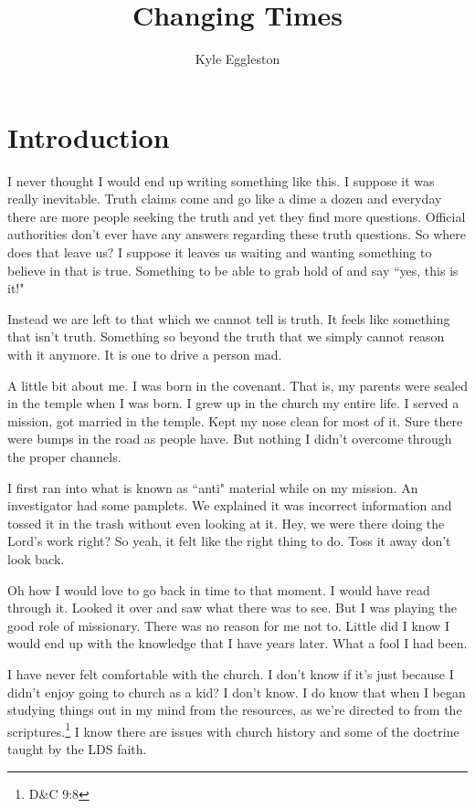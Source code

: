 \documentclass{article}
\title{Changing Times}
\author{Kyle Eggleston}
\begin{document}
\maketitle
\newpage

\tableofcontents
\thispagestyle{empty}
\newpage

\section{Introduction}

I never thought I would end up writing something like this. I suppose it was
really inevitable. Truth claims come and go like a dime a dozen and everyday
there are more people seeking the truth and yet they find more questions.
Official authorities don't ever have any answers regarding these truth
questions. So where does that leave us? I suppose it leaves us waiting and
wanting something to believe in that is true. Something to be able to grab hold
of and say ``yes, this is it!"

Instead we are left to that which we cannot tell is truth. It feels like
something that isn't truth. Something so beyond the truth that we simply cannot
reason with it anymore. It is one to drive a person mad.

A little bit about me. I was born in the covenant. That is, my parents were
sealed in the temple when I was born. I grew up in the church  my entire life. I
served a mission, got married in the temple. Kept my nose clean for most of it.
Sure there were bumps in the road as people have. But nothing I didn't overcome
through the proper channels.

I first ran into what is known as ``anti" material while on my mission. An
investigator had some pamplets. We explained it was incorrect information and
tossed it in the trash without even looking at it. Hey, we were there doing the
Lord's work right? So yeah, it felt like the right thing to do. Toss it away
don't look back.

Oh how I would love to go back in time to that moment. I would have read through
it. Looked it over and saw what there was to see. But I was playing the good
role of missionary. There was no reason for me not to. Little did I know I would
end up with the knowledge that I have years later. What a fool I had been.

I have never felt comfortable with the church. I don't know if it's just because
I didn't enjoy going to church as a kid? I don't know. I do know that when I
began studying things out in my mind from the resources, as we're directed to
from the scriptures.\footnote{D\&C 9:8} I know there are issues with church 
history and some of the doctrine taught by the LDS faith.
\end{document}
